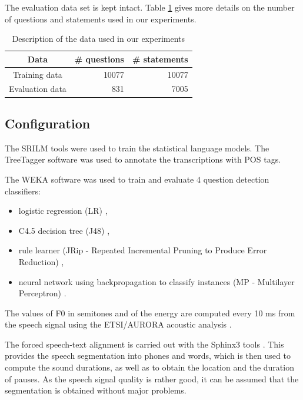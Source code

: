 \documentclass[conference]{IEEEtran}
\begin{document}
The evaluation data set is kept intact. 
Table \ref{Tab:usedData} gives more details on the number of questions and statements used in our experiments.  

\begin{table}[!b]
\renewcommand{\arraystretch}{1.3}
\caption{Description of the data used in our experiments} 
\label{Tab:usedData}
\centering
\begin{tabular}{|c|r|r|}
\hline
{\bf Data}  & {\bf \# questions}  & {\bf \# statements} 	\\ \hline
Training data 	& 10077 & 10077  \\ \hline
Evaluation data &   831 &  7005  \\ \hline
\end{tabular}
\end{table}
 
\subsection{Configuration}

The SRILM tools \cite{Stolcke:2002} were used to train the statistical language models. 
The TreeTagger software \cite{Schmid:1994} was used to annotate the transcriptions with POS tags.

The WEKA software \cite{Hall:2009} was used to train and evaluate 4 question detection classifiers: 
\begin{itemize}
\item logistic regression (LR) \cite{leCessie:1992}, 
\item C4.5 decision tree (J48) \cite{Quinlan:1993}, 
\item rule learner (JRip - Repeated Incremental Pruning to Produce Error Reduction) \cite{Cohen:1995}, 
\item neural network using backpropagation to classify instances (MP - Multilayer Perceptron) \cite{Ruck:1990}.
\end{itemize}

The values of F0 in semitones and of the energy are computed every 10 ms from the speech signal using the ETSI/AURORA acoustic analysis \cite{ETSI:2005}. 

The forced speech-text alignment is carried out with the Sphinx3 tools \cite{Placeway:1996}. This provides the speech segmentation into phones and words, which is then used to compute the sound durations, as well as to obtain the location and the duration of pauses. As the speech signal quality is rather good, it can be assumed that the segmentation is obtained without major problems.
\end{document}
